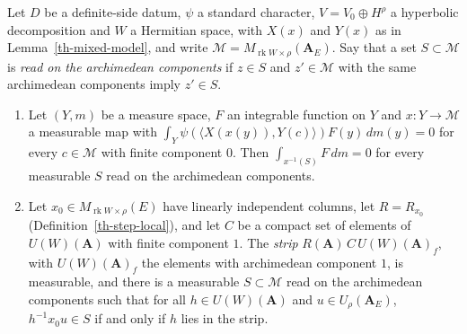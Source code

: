 \begin{lemma}\label{th-fourier-strips}
Let $D$ be a definite-side datum, $\psi$ a standard character,
$V=V_0\oplus H^\rho$ a hyperbolic decomposition and $W$ a Hermitian space, with
$X(x)$ and $Y(x)$ as in Lemma~\ref{th-mixed-model}, and write
$\mathcal M=M_{\operatorname{rk}W\times\rho}(\mathbf A_E)$. Say that a set
$S\subset\mathcal M$ is \emph{read on the archimedean components} if $z\in S$
and $z'\in\mathcal M$ with the same archimedean components imply $z'\in S$.
\begin{enumerate}
\item Let $(Y,m)$ be a measure space, $F$ an integrable function on $Y$ and
  $x\colon Y\to\mathcal M$ a measurable map with
  $\int_Y\psi(\langle X(x(y)),Y(c)\rangle)F(y)\,dm(y)=0$ for every
  $c\in\mathcal M$ with finite component $0$. Then $\int_{x^{-1}(S)}F\,dm=0$ for
  every measurable $S$ read on the archimedean components.
\item Let $x_0\in M_{\operatorname{rk}W\times\rho}(E)$ have linearly independent
  columns, let $R=R_{x_0}$ (Definition~\ref{th-step-local}), and let $C$ be a
  compact set of elements of $U(W)(\mathbf A)$ with finite component $1$. The
  \emph{strip} $R(\mathbf A)\,C\,U(W)(\mathbf A)_f$, with $U(W)(\mathbf A)_f$ the
  elements with archimedean component $1$, is measurable, and there is a
  measurable $S\subset\mathcal M$ read on the archimedean components such that
  for all $h\in U(W)(\mathbf A)$ and $u\in U_\rho(\mathbf A_E)$,
  $h^{-1}x_0u\in S$ if and only if $h$ lies in the strip.
\end{enumerate}
\end{lemma}
